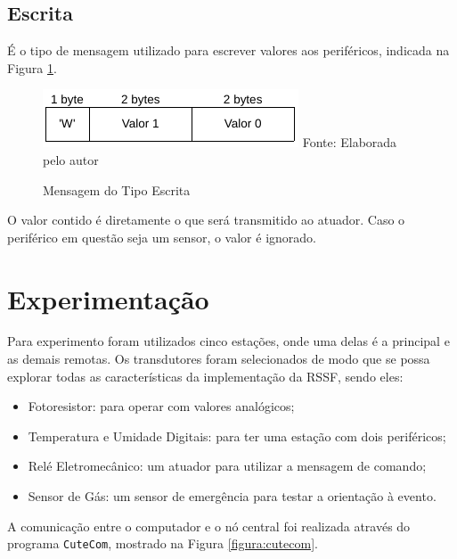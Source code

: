 {\subsection{Escrita}
É o tipo de mensagem utilizado para escrever valores aos periféricos, indicada na Figura
\ref{figura:message_esc}.

\begin{figure}[h!]
	\caption{Mensagem do Tipo Escrita}
	\centering
	\includegraphics[scale=0.5]{../images/mensagem_escrita.png}
	\hspace{\linewidth}
	Fonte: Elaborada pelo autor
	\label{figura:message_esc}
\end{figure}

O valor contido é diretamente o que será transmitido ao atuador. Caso o periférico em questão seja
um sensor, o valor é ignorado.

\section{Experimentação}
Para experimento foram utilizados cinco estações, onde uma delas é a principal e as demais remotas. Os
transdutores foram selecionados de modo que se possa explorar todas as características da implementação da
RSSF, sendo eles:

\begin{itemize}
	\item Fotoresistor: para operar com valores analógicos;
	\item Temperatura e Umidade Digitais: para ter uma estação com dois periféricos;
	\item Relé Eletromecânico: um atuador para utilizar a mensagem de comando;
	\item Sensor de Gás: um sensor de emergência para testar a orientação à evento.
\end{itemize}

A comunicação entre o computador e o nó central foi realizada através do programa \texttt{CuteCom}, mostrado na Figura
\ref{figura:cutecom}.

}
